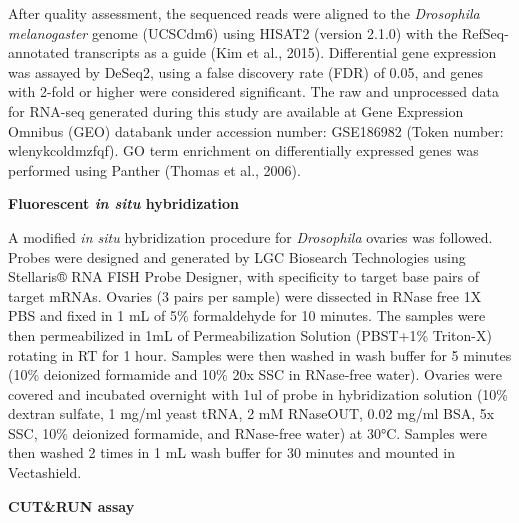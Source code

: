 \documentclass[12pt,oneside]{reedthesis}
\begin{document}
After quality assessment, the sequenced reads were aligned to the
\emph{Drosophila melanogaster} genome (UCSCdm6) using HISAT2 (version 2.1.0)
with the RefSeq-annotated transcripts as a guide (Kim et al., 2015).
Differential gene expression was assayed by DeSeq2, using a false
discovery rate (FDR) of 0.05, and genes with 2-fold or higher were
considered significant. The raw and unprocessed data for RNA-seq
generated during this study are available at Gene Expression Omnibus
(GEO) databank under accession number: GSE186982 (Token number:
wlenykcoldmzfqf). GO term enrichment on differentially expressed genes
was performed using Panther (Thomas et al., 2006).

\textbf{Fluorescent \emph{in situ} hybridization}

A modified \emph{in situ} hybridization procedure for \emph{Drosophila} ovaries
was followed. Probes were designed and generated by LGC Biosearch
Technologies using Stellaris® RNA FISH Probe Designer, with specificity
to target base pairs of target mRNAs. Ovaries (3 pairs per sample) were
dissected in RNase free 1X PBS and fixed in 1 mL of 5\% formaldehyde for
10 minutes. The samples were then permeabilized in 1mL of
Permeabilization Solution (PBST+1\% Triton-X) rotating in RT for 1 hour.
Samples were then washed in wash buffer for 5 minutes (10\% deionized
formamide and 10\% 20x SSC in RNase-free water). Ovaries were covered and
incubated overnight with 1ul of probe in hybridization solution (10\%
dextran sulfate, 1 mg/ml yeast tRNA, 2 mM RNaseOUT, 0.02 mg/ml BSA, 5x
SSC, 10\% deionized formamide, and RNase-free water) at 30°C. Samples
were then washed 2 times in 1 mL wash buffer for 30 minutes and mounted
in Vectashield.

\textbf{CUT\&RUN assay}
\end{document}
